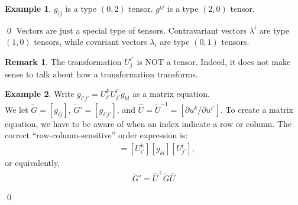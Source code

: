 \documentclass{book}
\theoremstyle{definition}
\newtheorem{rmk}{Remark}[section]
\newtheorem{exmp}{Example}[section]
\begin{document}
\begin{exmp}
	$g_{ij}$ is a type $(0,2)$ tensor. $g^{ij}$ is a type $(2,0)$ tensor. 
\end{exmp}\qed
Vectors are just a special type of tensors. Contravariant vectors $\lambda^i$ are type $(1,0)$ tensors, while covariant vectors $\lambda_i$ are type $(0,1)$ tensors. 
\begin{rmk}
	The transformation $U^{i'}_j$ is NOT a tensor. Indeed, it does not make sense to talk about how a transformation transforms. 
\end{rmk}
\begin{exmp}
	Write $g_{i'j'} = U^k_{i'}U^l_{j'}g_{kl}$ as a matrix equation.\\
	
	We let $\tilde{G} = [g_{ij}]$, $\tilde{G}'= [g_{i'j'}]$, and $\hat{U} = \tilde{U}^{-1} = [\partial u^k/\partial u^{i'}]$. To create a matrix equation, we have to be aware of when an index indicate a row or column. The correct ``row-column-sensitive'' order expression is:
	\begin{align*}
	[g_{i'j'}] &= [U^{k}_{i'}][g_{kl}][U^l_{j'}],
	\end{align*}
	or equivalently,
	\begin{align*}
	\boxed{\tilde{G}' = \hat{U}^{\top}\tilde{G}\hat{U}}
	\end{align*}
\end{exmp}\qed
\end{document}
